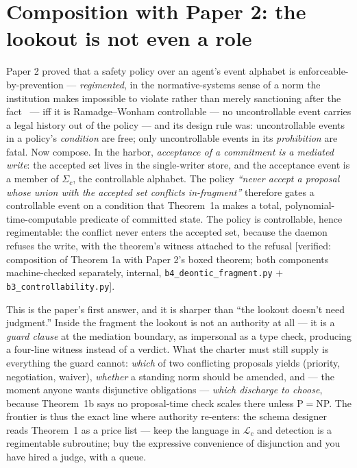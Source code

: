 \documentclass[11pt,a4paper]{article}
\begin{document}
\section{Composition with Paper 2: the lookout is not even a role}\label{sec:regiment}
Paper 2 proved that a safety policy over an agent's event alphabet is enforceable-by-prevention --- \emph{regimented}, in the
normative-systems sense of a norm the institution makes impossible to violate rather than merely sanctioning after the
fact~\cite{js93} --- iff it is Ramadge--Wonham controllable --- no uncontrollable event carries a legal history out of the policy --- and its design rule was:
uncontrollable events in a policy's \emph{condition} are free; only uncontrollable events in its \emph{prohibition} are fatal.
Now compose. In the harbor, \emph{acceptance of a commitment is a mediated write}: the accepted set lives in the single-writer
store, and the acceptance event is a member of $\Sigma_c$, the controllable alphabet. The policy \emph{``never accept a proposal
whose union with the accepted set conflicts in-fragment''} therefore gates a controllable event on a condition that Theorem~1a
makes a total, polynomial-time-computable predicate of committed state. The policy is controllable, hence regimentable: the
conflict never enters the accepted set, because the daemon refuses the write, with the theorem's witness attached to the refusal
[verified: composition of Theorem 1a with Paper 2's boxed theorem; both components machine-checked separately, internal,
\texttt{b4\_deontic\_fragment.py} $+$ \texttt{b3\_controllability.py}].

This is the paper's first answer, and it is sharper than ``the lookout doesn't need judgment.'' Inside the fragment the lookout is
not an authority at all --- it is a \emph{guard clause} at the mediation boundary, as impersonal as a type check, producing a
four-line witness instead of a verdict. What the charter must still supply is everything the guard cannot: \emph{which} of two
conflicting proposals yields (priority, negotiation, waiver), \emph{whether} a standing norm should be amended, and --- the moment
anyone wants disjunctive obligations --- \emph{which discharge to choose}, because Theorem~1b says no proposal-time check scales
there unless P$=$NP. The frontier is thus the exact line where authority re-enters: the schema designer reads Theorem~1 as a price
list --- keep the language in $\mathcal{L}_c$ and detection is a regimentable subroutine; buy the expressive convenience of
disjunction and you have hired a judge, with a queue.
\end{document}
